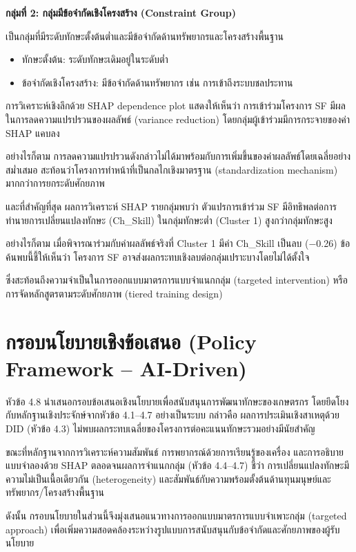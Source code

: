 \textbf{กลุ่มที่ 2: กลุ่มมีข้อจำกัดเชิงโครงสร้าง (Constraint Group)}

เป็นกลุ่มที่มีระดับทักษะตั้งต้นต่ำและมีข้อจำกัดด้านทรัพยากรและโครงสร้างพื้นฐาน

\begin{itemize}
\item ทักษะตั้งต้น: ระดับทักษะเดิมอยู่ในระดับต่ำ
\item ข้อจำกัดเชิงโครงสร้าง: มีข้อจำกัดด้านทรัพยากร เช่น การเข้าถึงระบบชลประทาน
\end{itemize}

การวิเคราะห์เชิงลึกด้วย SHAP dependence plot แสดงให้เห็นว่า การเข้าร่วมโครงการ SF มีผลในการลดความแปรปรวนของผลลัพธ์ (variance reduction) โดยกลุ่มผู้เข้าร่วมมีการกระจายของค่า SHAP แคบลง

อย่างไรก็ตาม การลดความแปรปรวนดังกล่าวไม่ได้มาพร้อมกับการเพิ่มขึ้นของค่าผลลัพธ์โดยเฉลี่ยอย่างสม่ำเสมอ สะท้อนว่าโครงการทำหน้าที่เป็นกลไกเชิงมาตรฐาน (standardization mechanism) มากกว่าการยกระดับศักยภาพ

และที่สำคัญที่สุด ผลการวิเคราะห์ SHAP รายกลุ่มพบว่า ตัวแปรการเข้าร่วม SF มีอิทธิพลต่อการทำนายการเปลี่ยนแปลงทักษะ (Ch\_Skill) ในกลุ่มทักษะต่ำ (Cluster 1) สูงกว่ากลุ่มทักษะสูง

อย่างไรก็ตาม เมื่อพิจารณาร่วมกับค่าผลลัพธ์จริงที่ Cluster 1 มีค่า Ch\_Skill เป็นลบ (−0.26) ข้อค้นพบนี้ชี้ให้เห็นว่า โครงการ SF อาจส่งผลกระทบเชิงลบต่อกลุ่มเปราะบางโดยไม่ได้ตั้งใจ

ซึ่งสะท้อนถึงความจำเป็นในการออกแบบมาตรการแบบจำแนกกลุ่ม (targeted intervention) หรือการจัดหลักสูตรตามระดับศักยภาพ (tiered training design)

\section{กรอบนโยบายเชิงข้อเสนอ (Policy Framework – AI-Driven)}

หัวข้อ 4.8 นำเสนอกรอบข้อเสนอเชิงนโยบายเพื่อสนับสนุนการพัฒนาทักษะของเกษตรกร โดยยึดโยงกับหลักฐานเชิงประจักษ์จากหัวข้อ 4.1–4.7 อย่างเป็นระบบ กล่าวคือ ผลการประเมินเชิงสาเหตุด้วย DID (หัวข้อ 4.3) ไม่พบผลกระทบเฉลี่ยของโครงการต่อคะแนนทักษะรวมอย่างมีนัยสำคัญ

ขณะที่หลักฐานจากการวิเคราะห์ความสัมพันธ์ การพยากรณ์ด้วยการเรียนรู้ของเครื่อง และการอธิบายแบบจำลองด้วย SHAP ตลอดจนผลการจำแนกกลุ่ม (หัวข้อ 4.4–4.7) ชี้ว่า การเปลี่ยนแปลงทักษะมีความไม่เป็นเนื้อเดียวกัน (heterogeneity) และสัมพันธ์กับความพร้อมตั้งต้นด้านทุนมนุษย์และทรัพยากร/โครงสร้างพื้นฐาน

ดังนั้น กรอบนโยบายในส่วนนี้จึงมุ่งเสนอแนวทางการออกแบบมาตรการแบบจำเพาะกลุ่ม (targeted approach) เพื่อเพิ่มความสอดคล้องระหว่างรูปแบบการสนับสนุนกับข้อจำกัดและศักยภาพของผู้รับนโยบาย

